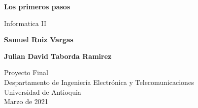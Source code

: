 \documentclass{article}
\begin{document}
\begin{titlepage}
    \begin{center}
        \vspace*{1cm}
            
        \Huge
        \textbf{Los primeros pasos}
            
        \vspace{0.5cm}
        \LARGE
        Informatica II
            
        \vspace{1.5cm}
            
        \textbf{Samuel Ruiz Vargas}
        \vspace{0.5cm}
        
        \textbf{Julian David Taborda Ramirez}
            
        \vfill
            
        \vspace{0.8cm}
            
        \Large
        Proyecto Final\\
        Despartamento de Ingeniería Electrónica y Telecomunicaciones\\
        Universidad de Antioquia\\
        Marzo de 2021
            
    \end{center}
\end{titlepage}
\end{document}
